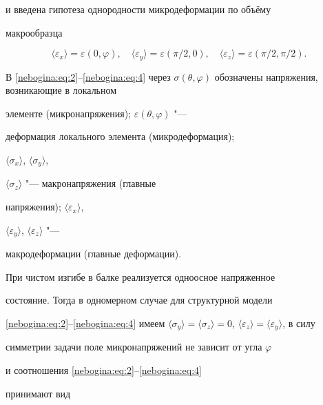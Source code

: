 и введена гипотеза однородности микродеформации по объёму

макрообразца

\begin{equation}

\label{nebogina:eq:4}

 \langle\varepsilon_x\rangle = \varepsilon

(0,\varphi),\quad  \langle\varepsilon_y\rangle = \varepsilon

(\pi/2, 0), \quad \langle\varepsilon_z\rangle = \varepsilon

(\pi/2,\pi/2).

\end{equation}



В \eqref{nebogina:eq:2}--\eqref{nebogina:eq:4} через $\sigma

(\theta,\varphi)$ обозначены напряжения, возникающие в локальном

элементе (микронапряжения); $\varepsilon (\theta,\varphi)$ "---

деформация локального элемента (микродеформация);

$\langle\sigma_x\rangle$, $\langle\sigma_y\rangle$,

$\langle\sigma_z\rangle$  "--- макронапряжения (главные

напряжения); $\langle\varepsilon_x\rangle$,

$\langle\varepsilon_y\rangle$, $\langle\varepsilon_z\rangle$ "---

макродеформации (главные деформации).



При чистом изгибе в балке реализуется одноосное напряженное

состояние. Тогда в одномерном случае для структурной модели

\eqref{nebogina:eq:2}--\eqref{nebogina:eq:4} имеем $\langle

\sigma_y \rangle = \langle \sigma_z \rangle =0$, $\langle

\varepsilon_z\rangle =\langle\varepsilon_y\rangle$, в силу

симметрии задачи поле микронапряжений не зависит от угла $\varphi$

и соотношения \eqref{nebogina:eq:2}--\eqref{nebogina:eq:4}

принимают вид

